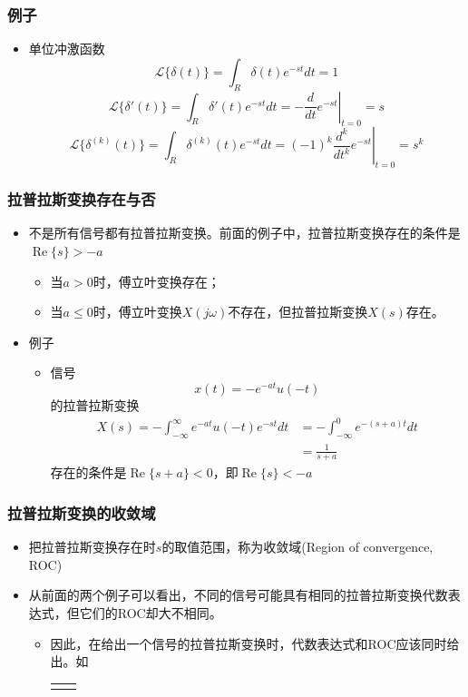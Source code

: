 \documentclass[CJKutf8,dvipsnames,table]{beamer}
\begin{document}
\begin{CJK*}{UTF8}{song}
  \begin{frame}
    \frametitle{例子}
    \begin{itemize}
    \item 单位冲激函数
    \[
		\mathscr{L}\{\delta(t)\} = \int_R \delta(t)e^{-st} dt = 1
    \]
    \[
		\mathscr{L}\{\delta'(t)\} = \int_R \delta'(t)e^{-st} dt = -\left. \frac{d}{dt}e^{-st} \right\vert_{t=0} = s
    \]
    \[
		\mathscr{L}\{\delta^{(k)}(t)\} = \int_R \delta^{(k)}(t)e^{-st} dt = (-1)^k\left. \frac{d^k}{dt^k}e^{-st} \right\vert_{t=0} = s^k
    \]
    \end{itemize}
  \end{frame} 
    
  \begin{frame}
    \frametitle{拉普拉斯变换存在与否}
    \begin{itemize}
    \item 不是所有信号都有拉普拉斯变换。前面的例子中，拉普拉斯变换存在的条件是$\operatorname{Re}\{s\} > -a$
		\begin{itemize}
		\item 当$a>0$时，傅立叶变换存在；
		\item 当$a \leq 0$时，傅立叶变换$X(j\omega)$不存在，但拉普拉斯变换$X(s)$存在。
		\end{itemize}
	\item 例子
    	\begin{itemize}
    	\item 信号
    	\[
    		x(t) = -e^{-at}u(-t)
    	\]
    	的拉普拉斯变换
    	\begin{align*}
    		X(s) = -\int_{-\infty}^{\infty} e^{-at} u(-t) e^{-st} dt & = -\int_{-\infty}^{0} e^{-(s+a)t} dt \\
	        	                                                     & = \frac{1}{s+a}       
    	\end{align*}
    	存在的条件是$\operatorname{Re}\{s+a\} < 0$，即$\operatorname{Re}\{s\} < -a$
    	\end{itemize}	
   	\end{itemize}
  \end{frame}  
       
  \begin{frame}
    \frametitle{拉普拉斯变换的收敛域}
    \begin{itemize}
    \item 把拉普拉斯变换存在时$s$的取值范围，称为收敛域(Region of convergence, ROC)
	\item 从前面的两个例子可以看出，不同的信号可能具有相同的拉普拉斯变换代数表达式，但它们的ROC却大不相同。
		\begin{itemize}
		\item 因此，在给出一个信号的拉普拉斯变换时，代数表达式和ROC应该同时给出。如 \\
	\begin{tabular}{ll}
	\raisebox{-.5\height}


\end{tabular}
\end{itemize}
\end{itemize}
\end{frame}
\end{CJK*}
\end{document}
